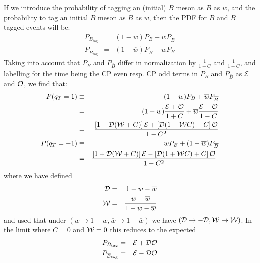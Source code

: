 \documentclass[a4paper,9pt,twoside]{article}
\begin{document}
If we introduce the probability of tagging an (initial) $B$ meson as $\overline{B}$ as $w$, and
the probability to tag an initial $\overline{B}$ meson as $B$ as $\overline{w}$, then the
PDF for $B$ and $\overline{B}$ tagged events will be:
\begin{eqnarray}
   P_{B_\mathrm{tag}} &=& (1-w) P_{B} + \overline{w} P_{\overline{ B} }\\
   P_{\overline{B}_\mathrm{tag}} &=& (1-\overline{w}) P_{\overline{B}} + w P_{ B }
\end{eqnarray} 
Taking into account that $P_{B}$ and $P_{\overline{B}}$ differ in normalization by
$\frac{1}{1+C}$ and $\frac{1}{1-C}$, and labelling for the time being the CP even 
resp. CP odd terms in $P_{B}$ and $P_{\overline{B}}$ as ${\cal E}$
and ${\cal O}$, we find that:
\begin{eqnarray}
   P(q_T=1) &\equiv& (1-w) P_{B} + \overline{w} P_{\overline{ B} } \\
     &=& (1-w)\frac{{\cal E} + {\cal O}}{1+C} + \overline{w}\frac{{\cal E}-{\cal O}}{1-C}  \\
     &=& \frac{  \left[ 1-{\cal D}({\cal W}+C) \right]{\cal E}
                               +\left[ {\cal D}(1 + {\cal W} C) - C \right] {\cal O}
                     }{1-C^2} \\
   P(q_T=-1) &\equiv& w P_{B} + (1-\overline{w}) P_{\overline{ B} } \\
     &=& \frac{  \left[ 1+{\cal D}({\cal W} + C)  \right]{\cal E}
                               -\left[ {\cal D}(1+{\cal W}C) +  C \right] {\cal O}
                        }{1-C^2}\ \\
\end{eqnarray} 
where we have defined
\begin{eqnarray}
 {\cal D} &=&1-w - \overline{w} \\
 {\cal W} &=& \frac{ w - \overline{w}}{1-w-\overline{w}}
\end{eqnarray}
and used that under $(w\rightarrow 1-w, \overline{w}\rightarrow 1-\overline{w})$ we have $({\cal D} \rightarrow -{\cal D},{\cal W}\rightarrow{\cal W})$.
In the limit where $C=0$ and ${\cal W}=0$  this reduces to the expected
\begin{eqnarray}
   P_{B_\mathrm{tag}} &=&   {\cal E} +{\cal D} {\cal O} \\
   P_{\overline{B}_\mathrm{tag}} &=&   {\cal E} -{\cal D} {\cal O} 
\end{eqnarray}
\end{document}
